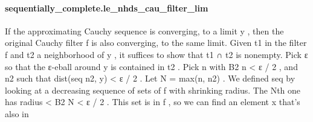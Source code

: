 \documentclass{article}
\begin{document}
\paragraph{sequentially\_complete.le\_nhds\_cau\_filter\_lim}
\par
If the approximating Cauchy sequence is converging, to a limit 
\colorbox[RGB]{253,246,227}{{{{\color[RGB]{101, 123, 131} y }}}}, then the
original Cauchy filter 
\colorbox[RGB]{253,246,227}{{{{\color[RGB]{101, 123, 131} f }}}} is also converging, to the same limit.
Given 
\colorbox[RGB]{253,246,227}{{{{\color[RGB]{101, 123, 131} t1 }}}} in the filter 
\colorbox[RGB]{253,246,227}{{{{\color[RGB]{101, 123, 131} f }}}} and 
\colorbox[RGB]{253,246,227}{{{{\color[RGB]{101, 123, 131} t2 }}}} a neighborhood of 
\colorbox[RGB]{253,246,227}{{{{\color[RGB]{101, 123, 131} y }}}}, it suffices to show that 
\colorbox[RGB]{253,246,227}{{{{\color[RGB]{101, 123, 131} t1 ∩ t2 }}}} is
nonempty.
Pick 
\colorbox[RGB]{253,246,227}{{{{\color[RGB]{101, 123, 131} ε }}}} so that the ε-eball around 
\colorbox[RGB]{253,246,227}{{{{\color[RGB]{101, 123, 131} y }}}} is contained in 
\colorbox[RGB]{253,246,227}{{{{\color[RGB]{101, 123, 131} t2 }}}}.
Pick 
\colorbox[RGB]{253,246,227}{{{{\color[RGB]{101, 123, 131} n }}}} with 
\colorbox[RGB]{253,246,227}{{{{\color[RGB]{101, 123, 131} B2 n  }}}{{{\color[RGB]{181, 137, 0} < }}}{{{\color[RGB]{101, 123, 131}  ε }}}{{{\color[RGB]{181, 137, 0} / }}}{{{\color[RGB]{108, 113, 196} 2 }}}}, and 
\colorbox[RGB]{253,246,227}{{{{\color[RGB]{101, 123, 131} n2 }}}} such that 
\colorbox[RGB]{253,246,227}{{{{\color[RGB]{101, 123, 131} dist(seq n2, y)  }}}{{{\color[RGB]{181, 137, 0} < }}}{{{\color[RGB]{101, 123, 131}  ε }}}{{{\color[RGB]{181, 137, 0} / }}}{{{\color[RGB]{108, 113, 196} 2 }}}}. Let 
\colorbox[RGB]{253,246,227}{{{{\color[RGB]{101, 123, 131} N  }}}{{{\color[RGB]{181, 137, 0} = }}}{{{\color[RGB]{101, 123, 131}  max(n, n2) }}}}.
We defined 
\colorbox[RGB]{253,246,227}{{{{\color[RGB]{101, 123, 131} seq }}}} by looking at a decreasing sequence of sets of 
\colorbox[RGB]{253,246,227}{{{{\color[RGB]{101, 123, 131} f }}}} with shrinking radius.
The Nth one has radius 
\colorbox[RGB]{253,246,227}{{{{\color[RGB]{181, 137, 0} < }}}{{{\color[RGB]{101, 123, 131}  B2 N  }}}{{{\color[RGB]{181, 137, 0} < }}}{{{\color[RGB]{101, 123, 131}  ε }}}{{{\color[RGB]{181, 137, 0} / }}}{{{\color[RGB]{108, 113, 196} 2 }}}}. This set is in 
\colorbox[RGB]{253,246,227}{{{{\color[RGB]{101, 123, 131} f }}}}, so we can find an element 
\colorbox[RGB]{253,246,227}{{{{\color[RGB]{101, 123, 131} x }}}} that's
also in 
\end{document}
